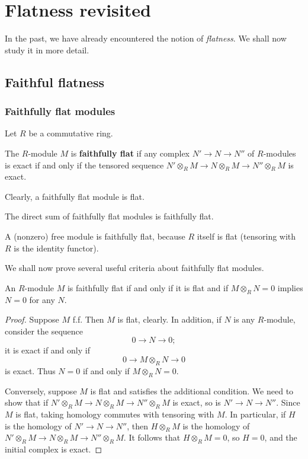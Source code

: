 \chapter{Flatness revisited}

In the past, we have already encountered the notion of \emph{flatness}. We
shall now study it in more detail.

\section{Faithful flatness}

\subsection{Faithfully flat modules}
Let $R$ be a commutative ring.

\begin{definition} 
The $R$-module $M$ is \textbf{faithfully flat} if  any complex $N' \to N
\to N''$ of $R$-modules is exact if and only if the tensored sequence $N'
\otimes_R M \to N \otimes_R M \to N'' \otimes_R M$ is exact.
\end{definition} 

Clearly, a faithfully flat module is flat.


\begin{example} 
The direct sum of faithfully flat modules is faithfully flat.
\end{example} 
\begin{example} 
A (nonzero)  free module is faithfully flat, because $R$ itself is flat
(tensoring with $R$ is the identity functor).
\end{example} 

We shall now prove several useful criteria about faithfully flat modules.

\begin{proposition}  \label{easyffcriterion}
An $R$-module $M$ is faithfully flat if and only if it is flat and if $M
\otimes_R N = 0$ implies $N=0$ for any $N$.
\end{proposition} 
\begin{proof} Suppose $M$ f.f.
Then $M$ is flat, clearly. In addition, if $N$ is any $R$-module, consider the
sequence
\[ 0 \to N \to 0;  \]
it is exact if and only if
\[ 0 \to M \otimes_R N \to 0  \]
is exact. Thus $N=0$ if and only if $M \otimes_R N = 0$.

Conversely, suppose $M$ is flat and satisfies the additional condition. We
need to show that if $N'
\otimes_R M \to N \otimes_R M \to N'' \otimes_R M$ is exact, so is $N' \to N
\to N''$. Since $M$ is flat, taking homology commutes with tensoring with $M$.
In particular, if $H$ is the homology of $N' \to N \to N''$, then $H \otimes_R
M$ is the homology of 
$N'
\otimes_R M \to N \otimes_R M \to N'' \otimes_R M$. It follows that $H
\otimes_R M = 0$, so $H=0$, and the initial complex is exact.
\end{proof} 


